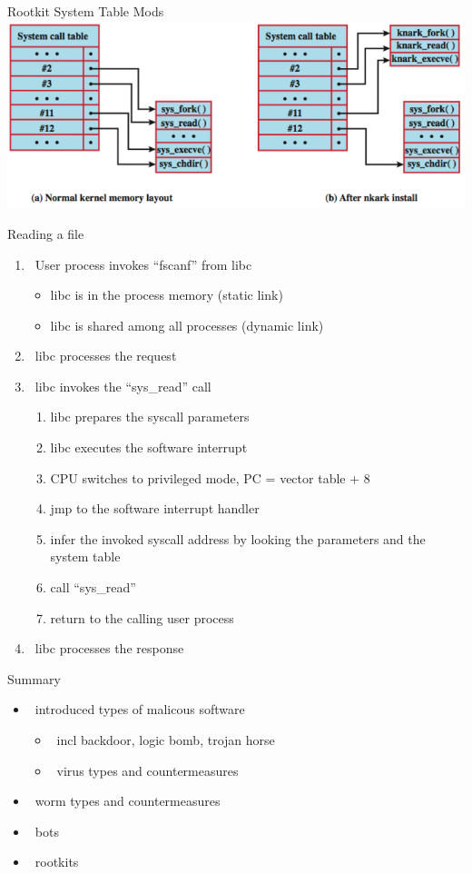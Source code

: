 \documentclass{beamer}
\begin{document}
\begin{frame}{Rootkit System Table Mods}
\includegraphics[width=0.8\linewidth]{rootkit}
\end{frame}

\begin{frame}{Reading a file}
  \begin{enumerate}
  \item  User process invokes ``fscanf'' from libc
  \begin{itemize}
    \item \alert<2>{libc is in the process memory (static link)}
    \item \alert<3>{libc is shared among all processes (dynamic link)}
  \end{itemize}
  \item  \alert<2-3>{libc processes the request}
  \item  libc invokes the ``sys\_read'' call
    \begin{enumerate}
      \item \alert<2-3>{libc prepares the syscall parameters}
      \item \alert<2-3>{libc executes the software interrupt}
      \item \alert<7>{CPU switches to privileged mode, PC = vector table + 8}
      \item \alert<4>{jmp to the software interrupt handler}
      \item \alert<6>{infer the invoked syscall address by looking the
        parameters and the system table}
      \item \alert<5>{call ``sys\_read''}
      \item return to the calling user process
    \end{enumerate}
  \item  \alert<2-3>{libc processes the response}
  \end{enumerate}
\end{frame}


\begin{frame}{Summary}
  \begin{itemize}
  \item  introduced types of malicous software 
    \begin{itemize}
    \item  incl backdoor, logic bomb, trojan horse 
    \item  virus types and countermeasures 
    \end{itemize}
  \item  worm types and countermeasures 
  \item  bots 
  \item  rootkits
  \end{itemize}
\end{frame}
\end{document}

